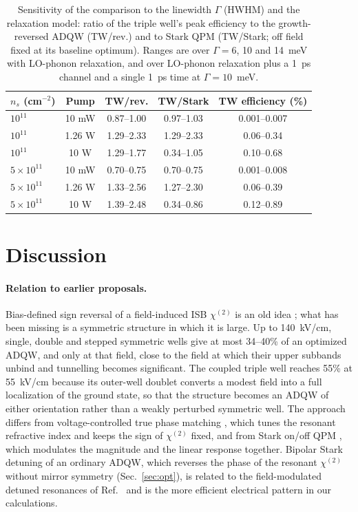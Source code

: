\documentclass[11pt]{article}
\newcommand{\chitwo}{\chi^{(2)}}
\begin{document}
\begin{table}[t]
\centering\small
\caption{Sensitivity of the comparison to the linewidth $\Gamma$ (HWHM) and the relaxation model: ratio of the triple well's peak efficiency to the growth-reversed ADQW (TW/rev.) and to Stark QPM (TW/Stark; off field fixed at its baseline optimum). Ranges are over $\Gamma=6$, 10 and 14~meV with LO-phonon relaxation, and over LO-phonon relaxation plus a 1~ps channel and a single 1~ps time at $\Gamma=10$~meV.}\label{tab:sens}
\begin{tabular}{@{}lcccc@{}}
\toprule
$n_s$ (cm$^{-2}$) & Pump & TW/rev. & TW/Stark & TW efficiency (\%) \\ \midrule
$10^{11}$ & 10 mW & 0.87--1.00 & 0.97--1.03 & 0.001--0.007 \\
$10^{11}$ & 1.26 W & 1.29--2.33 & 1.29--2.33 & 0.06--0.34 \\
$10^{11}$ & 10 W & 1.29--1.77 & 0.34--1.05 & 0.10--0.68 \\
$5\times10^{11}$ & 10 mW & 0.70--0.75 & 0.70--0.75 & 0.001--0.008 \\
$5\times10^{11}$ & 1.26 W & 1.33--2.56 & 1.27--2.30 & 0.06--0.39 \\
$5\times10^{11}$ & 10 W & 1.39--2.48 & 0.34--0.86 & 0.12--0.89 \\ \bottomrule
\end{tabular}
\end{table}

\section{Discussion}
\paragraph{Relation to earlier proposals.} Bias-defined sign reversal of a field-induced ISB $\chitwo$ is an old idea \cite{Patent4880297,Patent5289309}; what has been missing is a symmetric structure in which it is large. Up to 140~kV/cm, single, double and stepped symmetric wells give at most 34--40\% of an optimized ADQW, and only at that field, close to the field at which their upper subbands unbind and tunnelling becomes significant. The coupled triple well reaches 55\% at 55~kV/cm because its outer-well doublet converts a modest field into a full localization of the ground state, so that the structure becomes an ADQW of either orientation rather than a weakly perturbed symmetric well. The approach differs from voltage-controlled true phase matching \cite{Meyer1995APL}, which tunes the resonant refractive index and keeps the sign of $\chitwo$ fixed, and from Stark on/off QPM \cite{Belkin2006}, which modulates the magnitude and the linear response together. Bipolar Stark detuning of an ordinary ADQW, which reverses the phase of the resonant $\chitwo$ without mirror symmetry (Sec.~\ref{sec:opt}), is related to the field-modulated detuned resonances of Ref.~\cite{Vurgaftman1996SSC} and is the more efficient electrical pattern in our calculations.
\end{document}
